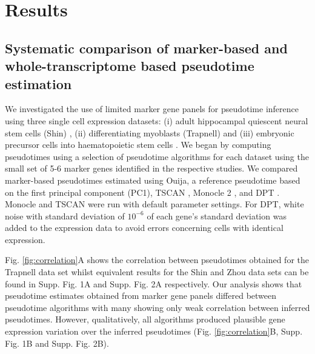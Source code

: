 \section{Results}


{\color{red}


\subsection{Systematic comparison of marker-based and whole-transcriptome based pseudotime estimation}

We investigated the use of limited marker gene panels for pseudotime inference using three single cell expression datasets: (i) adult hippocampal quiescent neural stem cells (Shin) \cite{Shin2015}, (ii) differentiating myoblasts (Trapnell) \cite{Trapnell2014} and (iii) embryonic precursor cells into haematopoietic stem cells \cite{zhou2016tracing}. We began by computing pseudotimes using a selection of pseudotime algorithms for each dataset using the small set of 5-6 marker genes identified in the respective studies. We compared marker-based pseudotimes estimated using Ouija, a reference pseudotime based on the first principal component (PC1), TSCAN  \cite{ji2016tscan}, Monocle 2 \cite{qiu2017reversed}, and DPT \cite{haghverdi2016diffusion}. Monocle and TSCAN were run with default parameter settings. For DPT, white noise with standard deviation of $10^{-6}$ of each gene’s standard deviation was added to the expression data to avoid errors concerning cells with identical expression.


%
%

Fig. \ref{fig:correlation}A shows the correlation between pseudotimes obtained for the Trapnell data set whilst equivalent results for the Shin and Zhou data sets can be found in Supp. Fig. 1A and Supp. Fig. 2A respectively. Our analysis shows that pseudotime estimates obtained from marker gene panels differed between pseudotime algorithms with many showing only weak correlation between inferred pseudotimes. However, qualitatively, all algorithms produced plausible gene expression variation over the inferred pseudotimes (Fig. \ref{fig:correlation}B, Supp. Fig. 1B and Supp. Fig. 2B).


}
